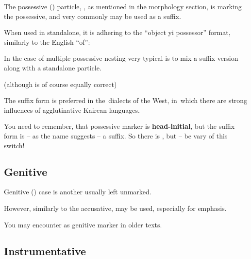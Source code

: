 The possessive (\Poss{}) particle, , as mentioned in the morphology
section, is marking the possessive, and very commonly may be used as a suffix.

When used in standalone, it is adhering to the ``object yi possessor'' format,
similarly to the English ``of'':


In the case of multiple possessive nesting very typical is to mix a suffix
version along with a standalone particle.


(although  is of course equally
correct)

The suffix form is preferred in the~dialects of the West, in~which there are
strong influences of agglutinative Kairean languages.

You need to remember, that possessive marker is \textbf{head-initial}, but the
suffix form is -- as the name suggests -- a suffix. So there is , but  -- be vary of this switch!

\subsection{Genitive}

Genitive (\Gen{}) case is another usually left unmarked.


However, similarly to the accusative,  may be used, especially for
emphasis.


You may encounter  as genitive marker in older texts.

\subsection{Instrumentative}

